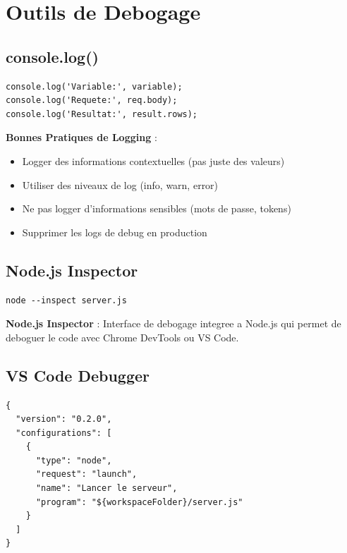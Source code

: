 \documentclass[a4paper,12pt]{book}
\begin{document}
\section{Outils de Debogage}

\subsection{console.log()}

\begin{lstlisting}[style=javascript, caption=Debogage avec console.log]
console.log('Variable:', variable);
console.log('Requete:', req.body);
console.log('Resultat:', result.rows);
\end{lstlisting}

\begin{bestpracticebox}
    \textbf{Bonnes Pratiques de Logging} :
    \begin{itemize}
        \item Logger des informations contextuelles (pas juste des valeurs)
        \item Utiliser des niveaux de log (info, warn, error)
        \item Ne pas logger d'informations sensibles (mots de passe, tokens)
        \item Supprimer les logs de debug en production
    \end{itemize}
\end{bestpracticebox}

\subsection{Node.js Inspector}

\begin{lstlisting}[style=bash, caption=Demarrage avec le debugger]
node --inspect server.js
\end{lstlisting}

\begin{definitionbox}
    \textbf{Node.js Inspector} : Interface de debogage integree a Node.js qui permet de deboguer le code avec Chrome DevTools ou VS Code.
\end{definitionbox}

\subsection{VS Code Debugger}

\begin{lstlisting}[style=bash, caption=.vscode/launch.json - Configuration VS Code]
{
  "version": "0.2.0",
  "configurations": [
    {
      "type": "node",
      "request": "launch",
      "name": "Lancer le serveur",
      "program": "${workspaceFolder}/server.js"
    }
  ]
}
\end{lstlisting}
\end{document}
